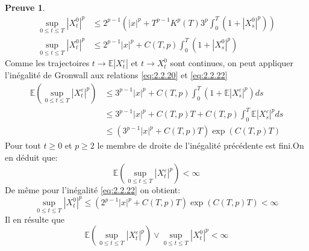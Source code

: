\documentclass[12pt,a4paper,twoside,fleqn]{book}%
\theoremstyle{definition}
\newtheorem*{pr}{\textbf{Preuve}}
\theoremstyle{lemme}
\numberwithin{equation}{section}
\begin{document}
\begin{pr}
\begin{equation}
\begin{aligned}
\sup_{0\leq t \leq T}|X_t^0|^p &\leq 2^{p-1}\left(|x|^p +T^{p-1}K^p(T)3^{p}\int_{0}^{T} \left(1+|X_s^0|^p\right)\right)\\
\sup_{0\leq t \leq T}|X_t^0|^p &\leq 2^{p-1}|x|^p +C(T,p)\int_{0}^{T} \left(1+|X_s^0|^p\right)
\end{aligned}
\end{equation}
Comme les trajectoires $t\to \mathbb{E}|X_t^\varepsilon|$ et $t\to X_t^0$ sont continues, on peut appliquer l’inégalité de Gronwall aux relations \ref{eq:2.2.20} et \ref{eq:2.2.22}
\[
\begin{aligned}
\mathbb{E}\left(\sup_{0\leq t \leq T}|X_t^\varepsilon|^p\right)&\leq  3^{p-1}|x|^p + C(T,p)\int_{0}^{T}\left(1 + \mathbb{E}|X_s^\varepsilon|^p\right)ds\\
&\leq 3^{p-1}|x|^p + C(T,p)T + C(T,p)\int_{0}^{T}\mathbb{E}|X_s^\varepsilon|^pds\\
&\leq \left(3^{p-1}|x|^p + C(T,p)T\right)\exp(C(T,p)T)
\end{aligned}
\]
Pour tout $t\geq 0$ et $p\geq2$ le membre de droite de l’inégalité précédente est fini.On en déduit que:
\[
\mathbb{E}\left(\sup_{0\leq t \leq T}|X_t^\varepsilon|^p\right)< \infty
\]
De même pour l'inégalité \ref{eq:2.2.22} on obtient:
\[
\sup_{0\leq t \leq T}|X_t^0|^p\leq \left(2^{p-1}|x|^p + C(T,p)T\right)\exp(C(T,p)T)<\infty
\]
Il en résulte que
\[
\mathbb{E}\left(\sup_{0\leq t \leq T}|X_t^\varepsilon|^p\right)\vee \sup_{0\leq t \leq T}|X_t^0|^p< \infty
\]
\end{pr}
\end{document}
